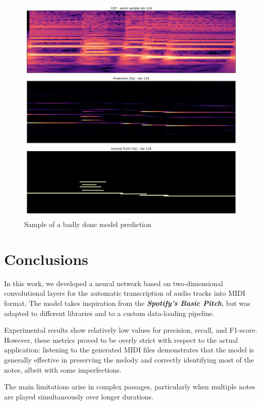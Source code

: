 \documentclass[10pt,twocolumn,letterpaper]{article}
\begin{document}
\begin{figure}[ht]
\begin{center}
  \includegraphics[width=0.9\linewidth]{images/worst__124.png}
\end{center}
  \caption{Sample of a badly done model prediction}\label{fig:worst}
\end{figure}

\section{Conclusions}\label{sec:conclusions}

In this work, we developed a neural network based on two-dimensional convolutional layers for the automatic transcription of audio tracks into MIDI format. The model takes inspiration from the \textbf{\textit{Spotify’s Basic Pitch}}, but was adapted to different libraries and to a custom data-loading pipeline.

Experimental results show relatively low values for precision, recall, and F1-score. However, these metrics proved to be overly strict with respect to the actual application: listening to the generated MIDI files demonstrates that the model is generally effective in preserving the melody and correctly identifying most of the notes, albeit with some imperfections.

The main limitations arise in complex passages, particularly when multiple notes are played simultaneously over longer durations.
\end{document}
